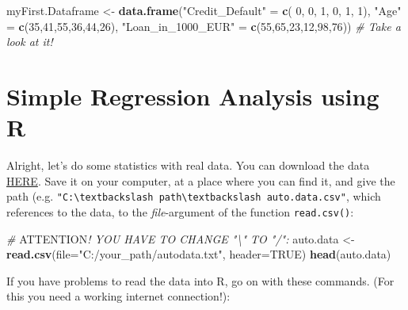 \documentclass[]{book}
\newenvironment{Shaded}{\begin{snugshade}}{\end{snugshade}}
\newcommand{\AlertTok}[1]{\textcolor[rgb]{0.94,0.16,0.16}{#1}}
\newcommand{\CommentTok}[1]{\textcolor[rgb]{0.56,0.35,0.01}{\textit{#1}}}
\newcommand{\DataTypeTok}[1]{\textcolor[rgb]{0.13,0.29,0.53}{#1}}
\newcommand{\DecValTok}[1]{\textcolor[rgb]{0.00,0.00,0.81}{#1}}
\newcommand{\KeywordTok}[1]{\textcolor[rgb]{0.13,0.29,0.53}{\textbf{#1}}}
\newcommand{\NormalTok}[1]{#1}
\newcommand{\OtherTok}[1]{\textcolor[rgb]{0.56,0.35,0.01}{#1}}
\newcommand{\StringTok}[1]{\textcolor[rgb]{0.31,0.60,0.02}{#1}}
\theoremstyle{definition}
\theoremstyle{definition}
\theoremstyle{definition}
\theoremstyle{remark}
\begin{document}
\begin{Shaded}
\begin{Highlighting}[]
\NormalTok{myFirst.Dataframe <-}\StringTok{ }\KeywordTok{data.frame}\NormalTok{(}\StringTok{"Credit_Default"}\NormalTok{   =}\StringTok{ }\KeywordTok{c}\NormalTok{( }\DecValTok{0}\NormalTok{, }\DecValTok{0}\NormalTok{, }\DecValTok{1}\NormalTok{, }\DecValTok{0}\NormalTok{, }\DecValTok{1}\NormalTok{, }\DecValTok{1}\NormalTok{), }
                                \StringTok{"Age"}\NormalTok{              =}\StringTok{ }\KeywordTok{c}\NormalTok{(}\DecValTok{35}\NormalTok{,}\DecValTok{41}\NormalTok{,}\DecValTok{55}\NormalTok{,}\DecValTok{36}\NormalTok{,}\DecValTok{44}\NormalTok{,}\DecValTok{26}\NormalTok{), }
                                \StringTok{"Loan_in_1000_EUR"}\NormalTok{ =}\StringTok{ }\KeywordTok{c}\NormalTok{(}\DecValTok{55}\NormalTok{,}\DecValTok{65}\NormalTok{,}\DecValTok{23}\NormalTok{,}\DecValTok{12}\NormalTok{,}\DecValTok{98}\NormalTok{,}\DecValTok{76}\NormalTok{)) }
\CommentTok{# Take a look at it!}
\end{Highlighting}
\end{Shaded}

\hypertarget{simple-regression-analysis-using-r}{%
\section{Simple Regression Analysis using R}\label{simple-regression-analysis-using-r}}

Alright, let's do some statistics with real data. You can download the data \href{https://github.com/lidom/Teaching_Repo}{HERE}. Save it on your computer, at a place where you can find it, and give the path (e.g. \texttt{"C:\textbackslash{}textbackslash\ path\textbackslash{}textbackslash\ auto.data.csv"}, which references to the data, to the \emph{file}-argument of the function \texttt{read.csv()}:

\begin{Shaded}
\begin{Highlighting}[]
\CommentTok{# }\AlertTok{ATTENTION}\CommentTok{! YOU HAVE TO CHANGE "\textbackslash{}" TO "/":}
\NormalTok{auto.data <-}\StringTok{ }\KeywordTok{read.csv}\NormalTok{(}\DataTypeTok{file=}\StringTok{"C:/your_path/autodata.txt"}\NormalTok{, }\DataTypeTok{header=}\OtherTok{TRUE}\NormalTok{)}
\KeywordTok{head}\NormalTok{(auto.data)}
\end{Highlighting}
\end{Shaded}

If you have problems to read the data into R, go on with these commands. (For this you need a working internet connection!):
\end{document}
